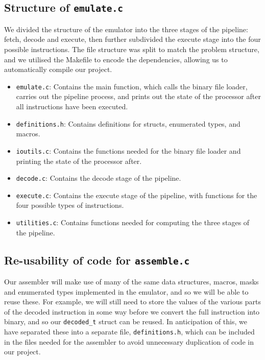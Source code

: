 \documentclass[11pt]{article}
\begin{document}
\subsection{Structure of \texttt{emulate.c}}

We divided the structure of the emulator into the three stages of the pipeline: fetch, decode and execute, then further subdivided the execute stage into the four possible instructions. The file structure was split to match the problem structure, and we utilised the Makefile to encode the dependencies, allowing us to automatically compile our project.

\begin{itemize}

\item \texttt{emulate.c}: Contains the main function, which calls the binary file loader, carries out the pipeline process, and prints out the state of the processor after all instructions have been executed.
\item \texttt{definitions.h}: Contains definitions for structs, enumerated types, and macros.
\item \texttt{ioutils.c}: Contains the functions needed for the binary file loader and printing the state of the processor after.
\item \texttt{decode.c}: Contains the decode stage of the pipeline.
\item \texttt{execute.c}: Contains the execute stage of the pipeline, with functions for the four possible types of instructions.
\item \texttt{utilities.c}: Contains functions needed for computing the  three stages of the pipeline.

\end{itemize}

\subsection{Re-usability of code for \texttt{assemble.c}}

Our assembler will make use of many of the same data structures, macros, masks and enumerated types implemented in the emulator, and so we will be able to reuse these. For example, we will still need to store the values of the various parts of the decoded instruction in some way before we convert the full instruction into binary, and so our \texttt{decoded\_t} struct can be reused. In anticipation of this, we have separated these into a separate file, \texttt{definitions.h}, which can be included in the files needed for the assembler to avoid unnecessary duplication of code in our project.
\end{document}
